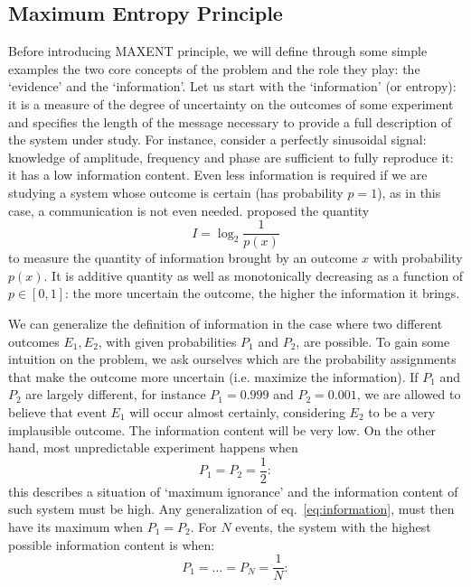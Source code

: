\documentclass{aa}
\begin{document}
\subsection{Maximum Entropy Principle} \label{sec:MAXENT}

Before introducing MAXENT principle, we will define through some simple examples the two core concepts of the problem and the role they play: the `evidence' and the `information'.
Let us start with the `information' (or entropy): it is a measure of the degree of uncertainty on the outcomes of some experiment and specifies the length of the message necessary to provide a full description of the system under study. For instance, consider a perfectly sinusoidal signal: knowledge of amplitude, frequency and phase are sufficient to fully reproduce it: it has a low information content. Even less information is required if we are studying a system whose outcome is certain (has probability $p = 1$), as in this case, a communication is not even needed.  
\citet{Shannon} proposed the quantity
\begin{equation}\label{eq:information}
    I = \log_2 \frac{1}{p(x)}
\end{equation}
to measure the quantity of information brought by an outcome $x$ with probability $p(x)$. It is additive quantity as well as monotonically decreasing as a function of $p \in [0, 1]$: the more uncertain the outcome, the higher the information it brings.

We can generalize the definition of information in the case where two different outcomes $E_1, E_2$, with given probabilities $P_1$ and $P_2$, are possible.
To gain some intuition on the problem, we ask ourselves which are the probability assignments that make the outcome more uncertain (i.e. maximize the information).
If $P_1$ and $P_2$ are largely different, for instance $P_1 = 0.999$ and $P_2 = 0.001$, we are allowed to believe that event $E_1$ will occur almost certainly, considering $E_2$ to be a very implausible outcome. The information content will be very low.
On the other hand, most unpredictable experiment happens when 
\begin{equation}\nonumber
    P_1 = P_2 = \frac{1}{2}:
\end{equation}
this describes a situation of `maximum ignorance' and the information content of such system must be high.
Any generalization of eq.~\eqref{eq:information}, must then have its maximum when $ P_1 = P_2$.
For $N$ events, the system with the highest possible information content is when:
\begin{equation}\nonumber
    P_1 = \hdots = P_N = \frac{1}{N}:
\end{equation}
\end{document}

